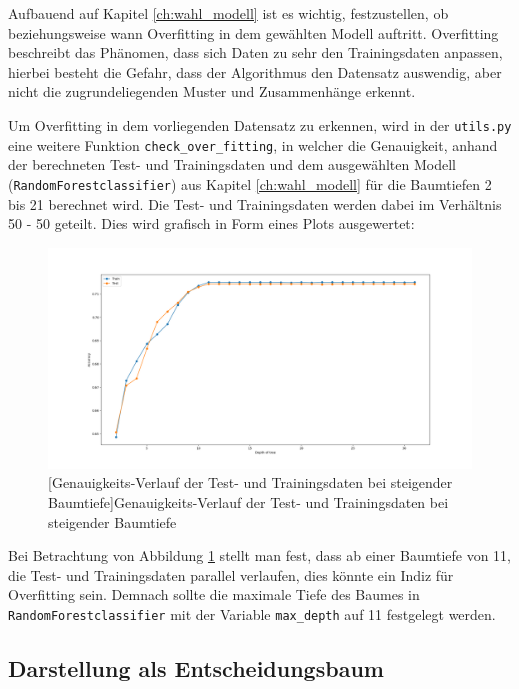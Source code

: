 \documentclass[13pt,a4paper, listof=entryprefix, bibliography=totocnumbered,toc=listofnumbered,lof=listofnumbered]{scrartcl}
\begin{document}
	Aufbauend auf Kapitel \ref{ch:wahl_modell} ist es wichtig, festzustellen, ob beziehungsweise wann Overfitting in dem gewählten Modell auftritt. Overfitting beschreibt das Phänomen, dass
	sich Daten zu sehr den Trainingsdaten anpassen, hierbei besteht die Gefahr, dass der Algorithmus den Datensatz auswendig, aber nicht die zugrundeliegenden Muster und Zusammenhänge erkennt.
	
	Um Overfitting in dem vorliegenden Datensatz zu erkennen, wird in der \lstinline{utils.py} eine weitere Funktion \lstinline{check_over_fitting}, in welcher
	die Genauigkeit, anhand der berechneten Test- und Trainingsdaten und dem ausgewählten Modell (\lstinline{RandomForestclassifier}) aus 
	Kapitel \ref{ch:wahl_modell} für die Baumtiefen 2 bis 21 berechnet wird. Die Test- und Trainingsdaten werden dabei im Verhältnis 50 - 50 geteilt. 
	Dies wird grafisch in Form eines Plots ausgewertet: 

	\begin{figure}[H]
		\centering
		\includegraphics[width=0.8\linewidth]{Bilder/overfitting_plot.png}
		[Genauigkeits-Verlauf der Test- und Trainingsdaten bei steigender Baumtiefe]{Genauigkeits-Verlauf der Test- und Trainingsdaten bei steigender Baumtiefe}
		\label{fig:overfitting}
	\end{figure}

	Bei Betrachtung von Abbildung \ref{fig:overfitting} stellt man fest, dass ab einer Baumtiefe von 11, die Test- und Trainingsdaten parallel 
	verlaufen, dies könnte ein Indiz für Overfitting sein. Demnach sollte die maximale Tiefe des Baumes in
	\lstinline{RandomForestclassifier} mit der Variable \lstinline{max_depth} auf 11 festgelegt werden.  


	\subsection{Darstellung als Entscheidungsbaum}
		\label{ch:entscheidungsbaum}
\end{document}
